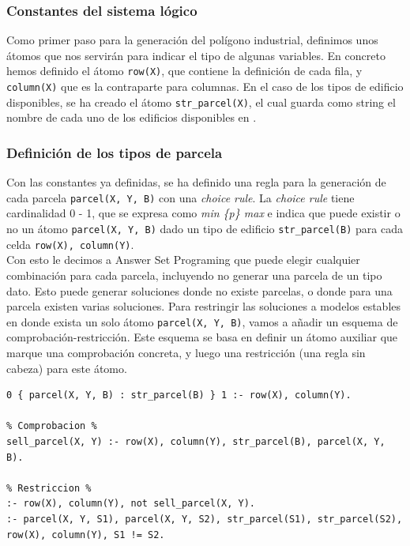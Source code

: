 \subsubsection{Constantes del sistema lógico}

Como primer paso para la generación del polígono industrial, definimos unos átomos que nos servirán para indicar el tipo de algunas variables. En concreto hemos definido el átomo \texttt{row(X)}, que contiene la definición de cada fila, y \texttt{column(X)} que es la contraparte para columnas. En el caso de los tipos de edificio disponibles, se ha creado el átomo \texttt{str\_parcel(X)}, el cual guarda como string el nombre de cada uno de los edificios disponibles en \cities.

\subsubsection{Definición de los tipos de parcela}

Con las constantes ya definidas, se ha definido una regla para la generación de cada parcela \texttt{parcel(X, Y, B)} con una \textit{choice rule}. La \textit{choice rule} tiene cardinalidad 0 - 1, que se expresa como \textit{min \{p\} max} e indica que puede existir o no un átomo \texttt{parcel(X, Y, B)} dado un tipo de edificio \texttt{str\_parcel(B)} para cada celda \texttt{row(X), column(Y)}. \\

Con esto le decimos a Answer Set Programing que puede elegir cualquier combinación para cada parcela, incluyendo no generar una parcela de un tipo dato. Esto puede generar soluciones donde no existe parcelas, o donde para una parcela existen varias soluciones. Para restringir las soluciones a modelos estables en donde exista un solo átomo \texttt{parcel(X, Y, B)}, vamos a añadir un esquema de comprobación-restricción. Este esquema se basa en definir un átomo auxiliar que marque una comprobación concreta, y luego una restricción (una regla sin cabeza) para este átomo.

\newpage

\begin{lstlisting}[caption={Código para la generación de parcelas},captionpos=b,label=lst:parcel_def]
% Generacion %
0 { parcel(X, Y, B) : str_parcel(B) } 1 :- row(X), column(Y).

% Comprobacion %
sell_parcel(X, Y) :- row(X), column(Y), str_parcel(B), parcel(X, Y, B).

% Restriccion %
:- row(X), column(Y), not sell_parcel(X, Y).
:- parcel(X, Y, S1), parcel(X, Y, S2), str_parcel(S1), str_parcel(S2), row(X), column(Y), S1 != S2.
\end{lstlisting}

